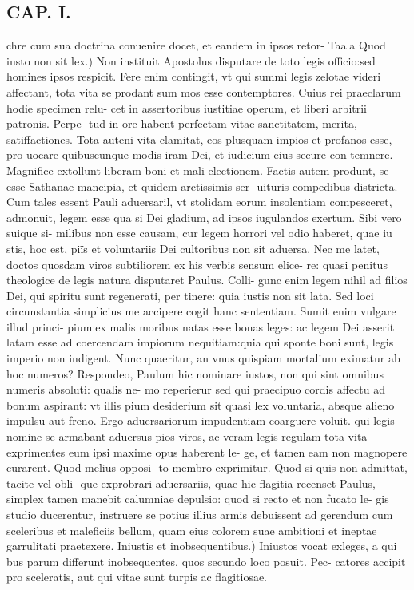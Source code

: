 \documentclass{article}
\begin{document}
\begin{pages}
\section*{CAP. I. }
\marginpar{[ p.7 ]}\pstart chre cum sua doctrina conuenire docet, et eandem in ipsos retor-  \pend\pstart Taala Quod iusto non sit lex.) Non instituit Apostolus disputare de toto legis officio:sed homines ipsos respicit. Fere enim contingit, vt qui summi legis zelotae videri affectant, tota vita se prodant sum mos esse contemptores. Cuius rei praeclarum hodie specimen relu- cet in assertoribus iustitiae operum, et liberi arbitrii patronis. Perpe- tud in ore habent perfectam vitae sanctitatem, merita, satiffactiones. Tota auteni vita clamitat, eos plusquam impios et profanos esse, pro uocare quibuscunque modis iram Dei, et iudicium eius secure con temnere. Magnifice extollunt liberam boni et mali electionem. Factis autem produnt, se esse Sathanae mancipia, et quidem arctissimis ser- uituris compedibus districta. Cum tales essent Pauli aduersaril, vt stolidam eorum insolentiam compesceret, admonuit, legem esse qua si Dei gladium, ad ipsos iugulandos exertum. Sibi vero suique si- milibus non esse causam, cur legem horrori vel odio haberet, quae iu stis, hoc est, piïs et voluntariis Dei cultoribus non sit aduersa. Nec me latet, doctos quosdam viros subtiliorem ex his verbis sensum elice- re: quasi penitus theologice de legis natura disputaret Paulus. Colli- gunc enim legem nihil ad filios Dei, qui spiritu sunt regenerati, per tinere: quia iustis non sit lata. Sed loci circunstantia simplicius me accipere cogit hanc sententiam. Sumit enim vulgare illud princi- pium:ex malis moribus natas esse bonas leges: ac legem Dei asserit latam esse ad coercendam impiorum nequitiam:quia qui sponte boni sunt, legis imperio non indigent. Nunc quaeritur, an vnus quispiam mortalium eximatur ab hoc numeros? Respondeo, Paulum hic nominare iustos, non qui sint omnibus numeris absoluti: qualis ne- mo reperierur sed qui praecipuo cordis affectu ad bonum aspirant: vt illis pium desiderium sit quasi lex voluntaria, absque alieno impulsu aut freno. Ergo aduersariorum impudentiam coarguere voluit. qui legis nomine se armabant aduersus pios viros, ac veram legis regulam tota vita exprimentes eum ipsi maxime opus haberent le- ge, et tamen eam non magnopere curarent. Quod melius opposi- to membro exprimitur. Quod si quis non admittat, tacite vel obli- que exprobrari aduersariis, quae hic flagitia recenset Paulus, simplex tamen manebit calumniae depulsio: quod si recto et non fucato le- gis studio ducerentur, instruere se potius illius armis debuissent ad gerendum cum sceleribus et maleficiis bellum, quam eius colorem suae ambitioni et ineptae garrulitati praetexere.  \pend\pstart Iniustis et inobsequentibus.) Iniustos vocat exleges, a qui bus parum differunt inobsequentes, quos secundo loco posuit. Pec- catores accipit pro sceleratis, aut qui vitae sunt turpis ac flagitiosae.  \pend

\end{pages}
\end{document}
